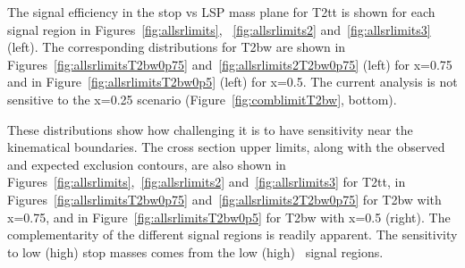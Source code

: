 
The signal efficiency in the stop vs LSP mass plane for T2tt is shown 
for each signal region in Figures~\ref{fig:allsrlimits},
~\ref{fig:allsrlimits2} and~\ref{fig:allsrlimits3} (left). The
corresponding distributions for T2bw are shown in 
Figures~\ref{fig:allsrlimitsT2bw0p75}
and~\ref{fig:allsrlimits2T2bw0p75} %
(left) for x=0.75 and in Figure~\ref{fig:allsrlimitsT2bw0p5} %
(left) for x=0.5. The current analysis is not sensitive to the x=0.25
scenario (Figure~\ref{fig:comblimitT2bw}, bottom).

These distributions show how
challenging it is to have sensitivity near the kinematical boundaries.
The cross section upper limits, along with the
observed and expected exclusion contours, are also shown in
Figures~\ref{fig:allsrlimits},~\ref{fig:allsrlimits2}
and~\ref{fig:allsrlimits3} for T2tt, in Figures~\ref{fig:allsrlimitsT2bw0p75}
and~\ref{fig:allsrlimits2T2bw0p75} %
for T2bw with x=0.75, and in Figure~\ref{fig:allsrlimitsT2bw0p5}
for T2bw with x=0.5 (right).
The complementarity of the different signal regions is readily apparent.  
The sensitivity to low (high) stop masses comes from the 
low (high) \met\ signal regions.

